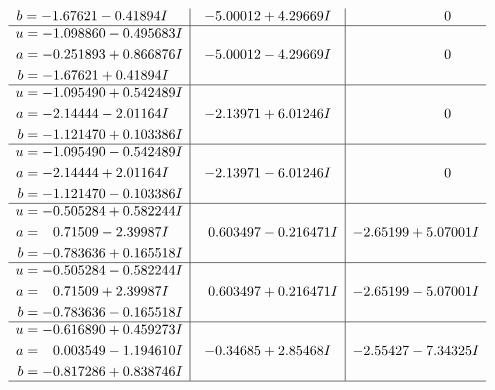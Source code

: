 \documentclass[1p]{elsarticle_modified}
\theoremstyle{definition}
\begin{document}
$$\begin{array}{c|c|c}
\begin{aligned}
b &= -1.67621 - 0.41894 I\end{aligned}
 & -5.00012 + 4.29669 I & \phantom{-0.000000 } 0 \\ \hline\begin{aligned}
u &= -1.098860 - 0.495683 I \\
a &= -0.251893 + 0.866876 I \\
b &= -1.67621 + 0.41894 I\end{aligned}
 & -5.00012 - 4.29669 I & \phantom{-0.000000 } 0 \\ \hline\begin{aligned}
u &= -1.095490 + 0.542489 I \\
a &= -2.14444 - 2.01164 I \\
b &= -1.121470 + 0.103386 I\end{aligned}
 & -2.13971 + 6.01246 I & \phantom{-0.000000 } 0 \\ \hline\begin{aligned}
u &= -1.095490 - 0.542489 I \\
a &= -2.14444 + 2.01164 I \\
b &= -1.121470 - 0.103386 I\end{aligned}
 & -2.13971 - 6.01246 I & \phantom{-0.000000 } 0 \\ \hline\begin{aligned}
u &= -0.505284 + 0.582244 I \\
a &= \phantom{-}0.71509 - 2.39987 I \\
b &= -0.783636 + 0.165518 I\end{aligned}
 & \phantom{-}0.603497 - 0.216471 I & -2.65199 + 5.07001 I \\ \hline\begin{aligned}
u &= -0.505284 - 0.582244 I \\
a &= \phantom{-}0.71509 + 2.39987 I \\
b &= -0.783636 - 0.165518 I\end{aligned}
 & \phantom{-}0.603497 + 0.216471 I & -2.65199 - 5.07001 I \\ \hline\begin{aligned}
u &= -0.616890 + 0.459273 I \\
a &= \phantom{-}0.003549 - 1.194610 I \\
b &= -0.817286 + 0.838746 I\end{aligned}
 & -0.34685 + 2.85468 I & -2.55427 - 7.34325 I\\
 \hline 
 \end{array}$$\newpage$$\begin{array}{c|c|c}  

\end{array}$$
\end{document}
